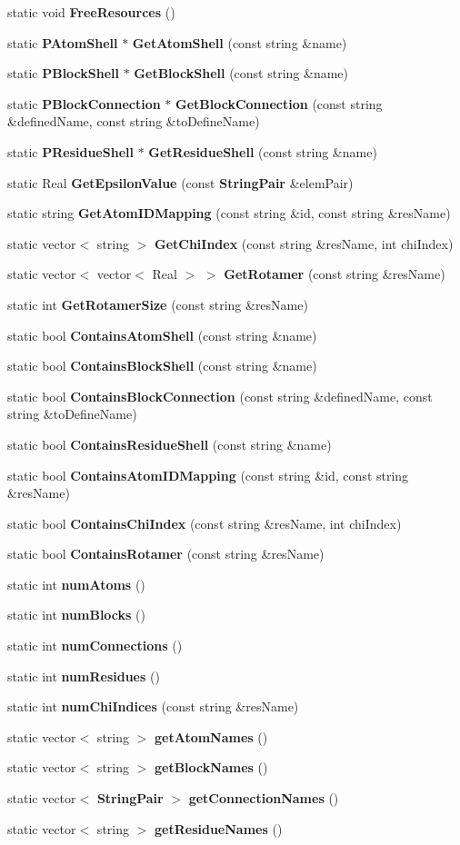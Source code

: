 \begin{CompactItemize}
\item 
static void {\bf Free\-Resources} ()
\item 
static {\bf PAtom\-Shell} $\ast$ {\bf Get\-Atom\-Shell} (const string \&name)
\item 
static {\bf PBlock\-Shell} $\ast$ {\bf Get\-Block\-Shell} (const string \&name)
\item 
static {\bf PBlock\-Connection} $\ast$ {\bf Get\-Block\-Connection} (const string \&defined\-Name, const string \&to\-Define\-Name)
\item 
static {\bf PResidue\-Shell} $\ast$ {\bf Get\-Residue\-Shell} (const string \&name)
\item 
static Real {\bf Get\-Epsilon\-Value} (const {\bf String\-Pair} \&elem\-Pair)
\item 
static string {\bf Get\-Atom\-IDMapping} (const string \&id, const string \&res\-Name)
\item 
static vector$<$ string $>$ {\bf Get\-Chi\-Index} (const string \&res\-Name, int chi\-Index)
\item 
static vector$<$ vector$<$ Real $>$ $>$ {\bf Get\-Rotamer} (const string \&res\-Name)
\item 
static int {\bf Get\-Rotamer\-Size} (const string \&res\-Name)
\item 
static bool {\bf Contains\-Atom\-Shell} (const string \&name)
\item 
static bool {\bf Contains\-Block\-Shell} (const string \&name)
\item 
static bool {\bf Contains\-Block\-Connection} (const string \&defined\-Name, const string \&to\-Define\-Name)
\item 
static bool {\bf Contains\-Residue\-Shell} (const string \&name)
\item 
static bool {\bf Contains\-Atom\-IDMapping} (const string \&id, const string \&res\-Name)
\item 
static bool {\bf Contains\-Chi\-Index} (const string \&res\-Name, int chi\-Index)
\item 
static bool {\bf Contains\-Rotamer} (const string \&res\-Name)
\item 
static int {\bf num\-Atoms} ()
\item 
static int {\bf num\-Blocks} ()
\item 
static int {\bf num\-Connections} ()
\item 
static int {\bf num\-Residues} ()
\item 
static int {\bf num\-Chi\-Indices} (const string \&res\-Name)
\item 
static vector$<$ string $>$ {\bf get\-Atom\-Names} ()
\item 
static vector$<$ string $>$ {\bf get\-Block\-Names} ()
\item 
static vector$<$ {\bf String\-Pair} $>$ {\bf get\-Connection\-Names} ()
\item 
static vector$<$ string $>$ {\bf get\-Residue\-Names} ()
\end{CompactItemize}
